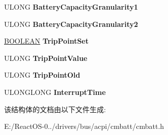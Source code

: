 \begin{DoxyCompactItemize}
U\+L\+O\+NG {\bfseries Battery\+Capacity\+Granularity1}
\item 
\mbox{\label{struct___c_m_b_a_t_t___d_e_v_i_c_e___e_x_t_e_n_s_i_o_n_ad2980f5c4341fe80cf8b14addcbc7a27}} 
U\+L\+O\+NG {\bfseries Battery\+Capacity\+Granularity2}
\item 
\mbox{\label{struct___c_m_b_a_t_t___d_e_v_i_c_e___e_x_t_e_n_s_i_o_n_a1941ec2618e6e47b20b3ce56d0265d61}} 
\hyperlink{_processor_bind_8h_a112e3146cb38b6ee95e64d85842e380a}{B\+O\+O\+L\+E\+AN} {\bfseries Trip\+Point\+Set}
\item 
\mbox{\label{struct___c_m_b_a_t_t___d_e_v_i_c_e___e_x_t_e_n_s_i_o_n_a2dd6941458912cec08e22b057d02d927}} 
U\+L\+O\+NG {\bfseries Trip\+Point\+Value}
\item 
\mbox{\label{struct___c_m_b_a_t_t___d_e_v_i_c_e___e_x_t_e_n_s_i_o_n_aa59a424eea2074d648915bc55b430bc8}} 
U\+L\+O\+NG {\bfseries Trip\+Point\+Old}
\item 
\mbox{\label{struct___c_m_b_a_t_t___d_e_v_i_c_e___e_x_t_e_n_s_i_o_n_a2a2e272935c5f8d96af74b517a9298ad}} 
U\+L\+O\+N\+G\+L\+O\+NG {\bfseries Interrupt\+Time}
\end{DoxyCompactItemize}


该结构体的文档由以下文件生成\+:\begin{DoxyCompactItemize}
\item 
E\+:/\+React\+O\+S-\/0../drivers/bus/acpi/cmbatt/cmbatt.\+h\end{DoxyCompactItemize}
